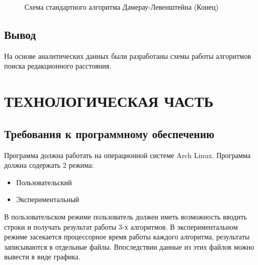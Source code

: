 \documentclass[a4paper,12pt]{article}
\begin{document}
\begin{figure}[p]
\caption{Схема стандартного алгоритма Дамерау-Левенштейна (Конец)}
\label{images:damerau_levenstein2}
\end{figure}

\newpage
\subsection{Вывод}
На основе аналитических данных были разработаны схемы работы алгоритмов поиска редакционного расстояния.


\newpage
\section{ТЕХНОЛОГИЧЕСКАЯ ЧАСТЬ}
\subsection{Требования к программному обеспечению}

\begin{flushleft}
Программа должна работать на операционной системе Arch Linux. Программа должна
содержать 2 режима:
\begin{itemize}
\item Пользовательский
\item Экспериментальный
\end{itemize}
В пользовательском режиме пользователь должен иметь возможность вводить строки и получать результат работы 3-х алгоритмов. В экспериментальном режиме засекается процессорное время работы каждого алгоритма, результаты записываются в отдельные файлы. Впоследствии данные из этих файлов можно вывести в виде графика.
\end{flushleft}
\end{document}
